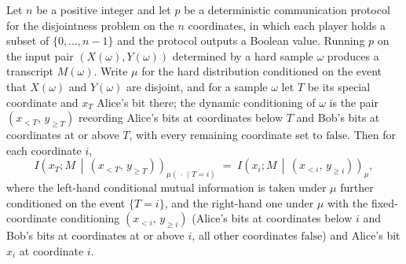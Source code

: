 \begin{theorem}
Let $n$ be a positive integer and let $p$ be a deterministic communication protocol for
the disjointness problem on the $n$ coordinates, in which each player holds a subset of
$\{0,\dots,n-1\}$ and the protocol outputs a Boolean value. Running $p$ on the input
pair $(X(\omega),Y(\omega))$ determined by a hard sample $\omega$ produces a transcript
$M(\omega)$. Write $\mu$ for the hard distribution conditioned on the event that
$X(\omega)$ and $Y(\omega)$ are disjoint, and for a sample $\omega$ let $T$ be its
special coordinate and $x_T$ Alice's bit there; the dynamic conditioning of $\omega$ is
the pair $(x_{<T},\,y_{\ge T})$ recording Alice's bits at coordinates below $T$ and
Bob's bits at coordinates at or above $T$, with every remaining coordinate set to
$\mathrm{false}$. Then for each coordinate $i$,
\[
I\!\left(x_T ; M \,\middle|\, (x_{<T},\,y_{\ge T})\right)_{\mu(\,\cdot\,\mid T=i)}
\;=\;
I\!\left(x_i ; M \,\middle|\, (x_{<i},\,y_{\ge i})\right)_{\mu},
\]
where the left-hand conditional mutual information is taken under $\mu$ further
conditioned on the event $\{T=i\}$, and the right-hand one under $\mu$ with the
fixed-coordinate conditioning $(x_{<i},\,y_{\ge i})$ (Alice's bits at coordinates below
$i$ and Bob's bits at coordinates at or above $i$, all other coordinates
$\mathrm{false}$) and Alice's bit $x_i$ at coordinate $i$.
\end{theorem}

